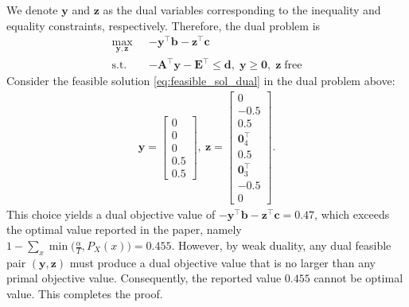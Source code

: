 \documentclass[11pt,letterpaper]{article}
\begin{document}
We denote $\mathbf{y}$ and $\mathbf{z}$ as the dual variables corresponding to the inequality and equality constraints, respectively. Therefore, the dual problem is 
\begin{align*}
    \max_{\mathbf{y}, \mathbf{z}}  ~~~ & -\mathbf{y}^\intercal\mathbf{b} - \mathbf{z}^\intercal \mathbf{c}\\
    \text{s.t.} ~~~ & -\mathbf{A}^\intercal\mathbf{y}-\mathbf{E}^\intercal \leq \mathbf{d}, \; \mathbf{y} \geq \mathbf{0}, \; \mathbf{z} \; \text{free}
\end{align*}
Consider the feasible solution \eqref{eq:feasible_sol_dual} in the dual problem above:
\begin{align}
    \mathbf{y} = \begin{bmatrix}
        0 \\ 0\\ 0 \\ 0.5\\ 0.5
    \end{bmatrix} , ~ \mathbf{z} = \begin{bmatrix}
        0 \\  -0.5\\ 0.5 \\ \mathbf{0}_4^\intercal \\0.5\\\mathbf{0}_3^\intercal \\ -0.5\\0
    \end{bmatrix}. \label{eq:feasible_sol_dual}
\end{align}
This choice yields a dual objective value of $-\mathbf{y}^\intercal\mathbf{b} - \mathbf{z}^\intercal \mathbf{c} = 0.47$, which exceeds the optimal value reported in the paper, namely $1-\sum_x \min \bigl(\tfrac{\alpha}{T}, P_X(x)\bigr) = 0.455$. However, by weak duality, any dual feasible pair $(\mathbf{y}, \mathbf{z})$ must produce a dual objective value that is no larger than any primal objective value. Consequently, the reported value $0.455$ cannot be optimal value. This completes the proof.






\vfill
\end{document}
